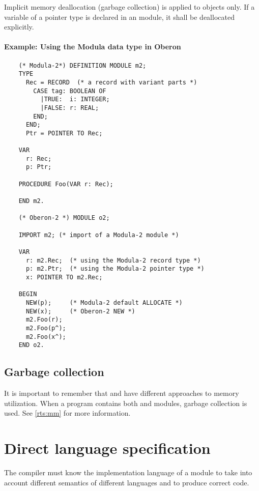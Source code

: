 Implicit memory deallocation (garbage collection) is applied to \ot{}
objects only. If a variable of a \mt{} pointer type is declared in
an \ot{} module, it shall be deallocated explicitly.

\paragraph{Example: Using the Modula data type in Oberon}
\begin{verbatim}
    (* Modula-2*) DEFINITION MODULE m2;
    TYPE
      Rec = RECORD  (* a record with variant parts *)
        CASE tag: BOOLEAN OF
          |TRUE:  i: INTEGER;
          |FALSE: r: REAL;
        END;
      END;
      Ptr = POINTER TO Rec;

    VAR
      r: Rec;
      p: Ptr;

    PROCEDURE Foo(VAR r: Rec);

    END m2.

    (* Oberon-2 *) MODULE o2;

    IMPORT m2; (* import of a Modula-2 module *)

    VAR
      r: m2.Rec;  (* using the Modula-2 record type *)
      p: m2.Ptr;  (* using the Modula-2 pointer type *)
      x: POINTER TO m2.Rec;

    BEGIN
      NEW(p);     (* Modula-2 default ALLOCATE *)
      NEW(x);     (* Oberon-2 NEW *)
      m2.Foo(r);
      m2.Foo(p^);
      m2.Foo(x^);
    END o2.
\end{verbatim}

\subsection{Garbage collection}

It is important to remember that \mt{} and \ot{} have different
approaches to memory utilization. When a program contains both
\mt{} and \ot{} modules, garbage collection is used.
See \ref{rts:mm} for more information.


\section{Direct language specification}\label{multilang:direct}

The compiler must know the implementation language of a
module to take into account different semantics of different
languages and to produce correct code.

